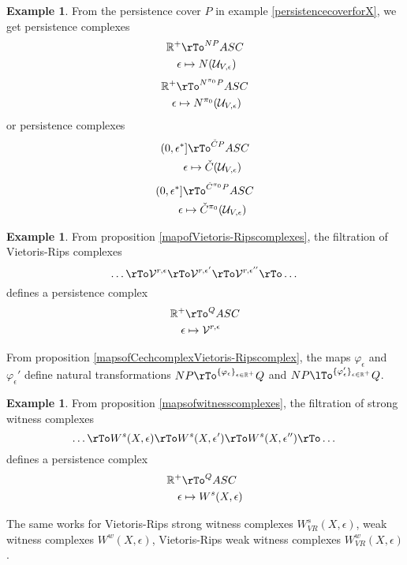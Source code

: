 \documentclass[12pt]{amsart}
\theoremstyle{definition}
\newtheorem{example}[theorem]{Example}
\begin{document}
\begin{example}\label{persistencecomplex2} From the persistence cover $P$ in example \ref{persistencecoverforX}, we get persistence complexes
\begin{align*}
\mathbb{R}^+ & \rTo^{NP} ASC \\
\epsilon & \mapsto N(\mathcal{U}_{V, \epsilon})
\end{align*}
\begin{align*}
\mathbb{R}^+ & \rTo^{N^{\pi_0}P} ASC \\
\epsilon & \mapsto N^{\pi_0}(\mathcal{U}_{V, \epsilon})
\end{align*}
or persistence complexes
\begin{align*}
(0, \epsilon^*] & \rTo^{\check{C}P} ASC \\
\epsilon & \mapsto \check{C}(\mathcal{U}_{V, \epsilon})
\end{align*}
\begin{align*}
(0, \epsilon^*] & \rTo^{\check{C}^{\pi_0}P} ASC \\
\epsilon & \mapsto \check{C}^{\pi_0}(\mathcal{U}_{V, \epsilon})
\end{align*}
\end{example}

\begin{example}\label{persistencecomplex3} From proposition \ref{mapofVietoris-Ripscomplexes}, the filtration of Vietoris-Rips complexes
$$\dots \rTo \mathcal{V}^{r, \epsilon} \rTo \mathcal{V}^{r, \epsilon'} \rTo \mathcal{V}^{r, \epsilon''} \rTo \dots$$
defines a persistence complex
\begin{align*}
\mathbb{R}^+ & \rTo^Q ASC \\
\epsilon & \mapsto \mathcal{V}^{r, \epsilon}
\end{align*}

From proposition \ref{mapsofCechcomplexVietoris-Ripscomplex}, the maps $\varphi_{\epsilon}$ and $\varphi_{\epsilon}'$ define natural transformations $NP \rTo^{\{\varphi_{\epsilon}\}_{\epsilon \in \mathbb{R}^+}} Q$ and $NP \lTo^{\{\varphi_{\epsilon}'\}_{\epsilon \in \mathbb{R}^+}} Q$.
\end{example}

\begin{example}\label{persistencecomplex4} From proposition \ref{mapsofwitnesscomplexes}, the filtration of strong witness complexes
$$\dots \rTo W^s(X, \epsilon) \rTo W^s(X, \epsilon') \rTo W^s(X, \epsilon'') \rTo \dots$$
defines a persistence complex
\begin{align*}
\mathbb{R}^+ & \rTo^Q ASC \\
\epsilon & \mapsto W^s(X, \epsilon)
\end{align*}

The same works for Vietoris-Rips strong witness complexes $W_{VR}^s(X, \epsilon)$, weak witness complexes $W^w(X, \epsilon)$, Vietoris-Rips weak witness complexes $W_{VR}^w(X, \epsilon)$.
\end{example}
\end{document}
